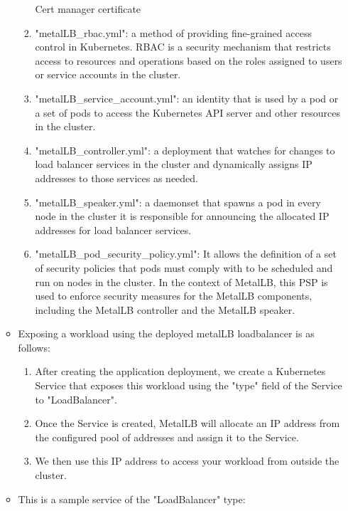 \begin{enumerate}[label = (\alph*)]
\begin{itemize}[label={--}]
\begin{enumerate}[label = (\arabic*)]
            \begin{listing}
            \inputminted{Yaml}{codeListing/metalLB_configmap.yml}
            \caption{Cert manager certificate }
            \label{lst:metalLB}
            \end{listing}

            \item "metalLB\_rbac.yml": a method of providing fine-grained access control in Kubernetes. RBAC is a security mechanism that restricts access to resources and operations based on the roles assigned to users or service accounts in the cluster. 
            \item "metalLB\_service\_account.yml": an identity that is used by a pod or a set of pods to access the Kubernetes API server and other resources in the cluster. 
            \item "metalLB\_controller.yml": a deployment that watches for changes to load balancer services in the cluster and dynamically assigns IP addresses to those services as needed. 
            \item "metalLB\_speaker.yml": a daemonset that spawns a pod in every node in the cluster it is responsible for announcing the allocated IP addresses for load balancer services. 
            \item "metalLB\_pod\_security\_policy.yml": It allows the definition of a set of security policies that pods must comply with to be scheduled and run on nodes in the cluster. In the context of MetalLB, this PSP is used to enforce security measures for the MetalLB components, including the MetalLB controller and the MetalLB speaker. 
            \end{enumerate}

        \item Exposing a workload using the deployed metalLB loadbalancer is as follows: 
            \begin{enumerate}[label = (\arabic*)]
                \item After creating the application deployment, we create a Kubernetes Service that exposes this workload using the "type" field of the Service to "LoadBalancer". 
                \item Once the Service is created, MetalLB will allocate an IP address from the configured pool of addresses and assign it to the Service. 
                \item We then use this IP address to access your workload from outside the cluster. 
            \end{enumerate}
        \item This is a sample service of the "LoadBalancer" type: 
        

\end{itemize}
\end{enumerate}
